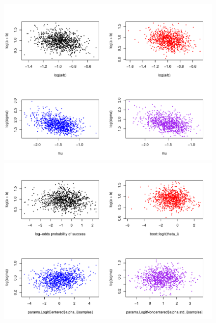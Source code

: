 \documentclass[12pt, oneside, titlepage]{article}   	%
\begin{document}
 \begin{figure}[h]
   \centering
       \includegraphics[page=1,width=.75\textwidth]{../figures/appendix/appendix-1/hyperparameterCorrelations}  
        \includegraphics[page=1,width=.75\textwidth]{../figures/appendix/appendix-1/funnelCheck}  
    \caption{   }
 \label{fig:...}
\end{figure}
\end{document}
